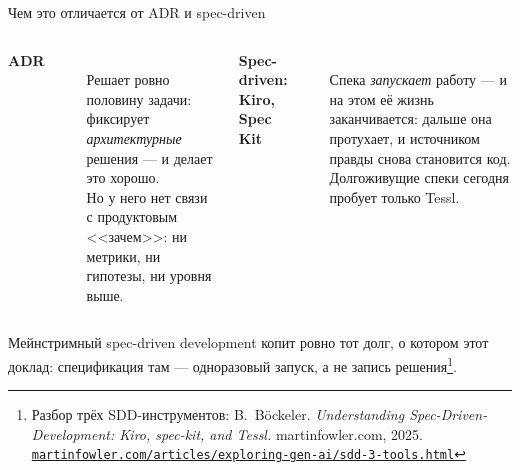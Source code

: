 \documentclass[11pt, aspectratio=169]{beamer}
\begin{document}
\begin{frame}{Чем это отличается от ADR и spec-driven}
  \vspace{0.25cm}
  \begin{columns}[t, onlytextwidth]

      \textbf{\small ADR}\\
      \textcolor{mutedText}{\rule{\linewidth}{0.4pt}}\\[5pt]
      \footnotesize Решает ровно половину задачи: фиксирует \emph{архитектурные}
      решения --- и делает это хорошо.\\[5pt]
      Но у него нет связи с продуктовым <<зачем>>: ни метрики, ни гипотезы,
      ни уровня выше.

      \textbf{\small Spec-driven: Kiro, Spec Kit}\\
      \textcolor{mutedText}{\rule{\linewidth}{0.4pt}}\\[5pt]
      \footnotesize Спека \emph{запускает} работу --- и на этом её жизнь
      заканчивается: дальше она протухает, и источником правды снова
      становится код.\\[5pt]
      Долгоживущие спеки сегодня пробует только Tessl.

  \end{columns}

  \vspace{0.4cm}
  \small Мейнстримный spec-driven development копит ровно тот долг, о котором
  этот доклад: спецификация там --- одноразовый запуск, а не запись
  решения\footnote{Разбор трёх SDD-инструментов: B.\ Böckeler.
  \textit{Understanding Spec-Driven-Development: Kiro, spec-kit, and Tessl.}
  martinfowler.com, 2025.
  \href{https://martinfowler.com/articles/exploring-gen-ai/sdd-3-tools.html}{\texttt{martinfowler.com/articles/exploring-gen-ai/sdd-3-tools.html}}}.
\end{frame}
\end{document}
